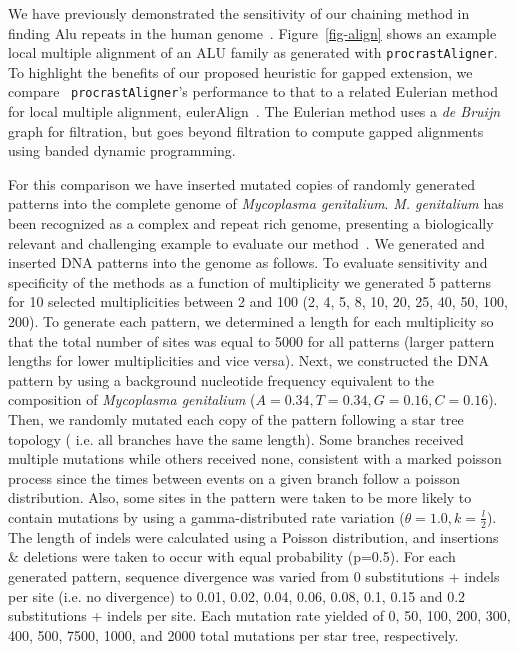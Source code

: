 \documentclass{ws-procs975x65}
\begin{document}
We have previously demonstrated the sensitivity of our chaining method in finding Alu repeats in
the human genome~\cite{ref-procrast}. Figure~\ref{fig-align} shows an example local multiple alignment of an ALU family as generated with \texttt{procrastAligner}. To highlight the benefits of our proposed heuristic for gapped extension, we compare ~\texttt{procrastAligner}'s performance to that to a related Eulerian method for local multiple alignment, eulerAlign~\cite{ref-related1}. The Eulerian method uses
a \textit{de Bruijn} graph for filtration, but goes beyond filtration to compute gapped alignments using banded dynamic
programming. 

For this comparison we have inserted mutated copies of randomly generated patterns into the complete genome of \emph{Mycoplasma genitalium}. \emph{M. genitalium} has been recognized as a complex and repeat rich genome, presenting a biologically relevant and challenging example to evaluate our method~\cite{ref-mycoplasma}. We generated and inserted DNA patterns into the genome as follows. To evaluate sensitivity and specificity of the methods as a function of multiplicity we generated 5 patterns for 10 selected multiplicities between 2 and 100 (2, 4, 5, 8, 10, 20, 25, 40, 50, 100, 200). To generate each pattern, we determined a length for each multiplicity so that the total number of sites was equal to 5000 for all patterns (larger pattern lengths for lower multiplicities and vice versa). Next, we constructed the DNA pattern by using a background nucleotide frequency equivalent to the composition of \emph{Mycoplasma genitalium} ($A=0.34,T=0.34,G=0.16,C=0.16$). Then, we randomly mutated each copy of the pattern following a star tree topology ( i.e. all branches have the same length).  Some branches received multiple mutations while others received none, consistent with a marked poisson process since the times between events on a given branch follow a poisson distribution. Also, some sites in the pattern were taken to be more likely to contain mutations by using a gamma-distributed rate variation ($\theta = 1.0, k = \frac{l}{2}$). The length of indels were calculated using a Poisson distribution, and insertions \& deletions were taken to occur with equal probability (p=0.5). For each generated pattern, sequence divergence was varied from 0 substitutions + indels per site (i.e. no divergence) to 0.01, 0.02, 0.04, 0.06, 0.08, 0.1, 0.15 and 0.2 substitutions + indels per site. Each mutation rate yielded of 0, 50, 100, 200, 300, 400, 500, 7500, 1000, and 2000 total mutations per star tree, respectively.
\end{document}
